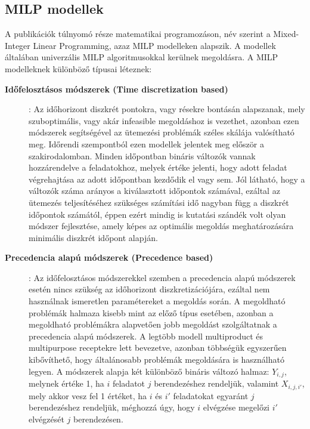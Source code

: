 \subsection{MILP modellek}
A publikációk túlnyomó része matematikai programozáson, név szerint a Mixed-Integer Linear Programming, azaz MILP modelleken alapszik.
A modellek általában univerzális MILP algoritmusokkal kerülnek megoldásra. \cite{9780471283669}
A MILP modelleknek különböző típusai léteznek:
\begin{description}
\item[\textbf{Időfelosztásos módszerek (Time discretization based)}]: Az időhorizont diszkrét pontokra, vagy résekre bontásán alapszanak, mely szuboptimális, vagy akár infeasible megoldáshoz is vezethet, azonban ezen módszerek segítségével az ütemezési problémák széles skálája valósítható meg.
Időrendi szempontból ezen modellek jelentek meg először a szakirodalomban. \cite{KONDILI1993211}
Minden időpontban bináris változók vannak hozzárendelve a feladatokhoz, melyek értéke jelenti, hogy adott feladat végrehajtása az adott időpontban kezdődik el vagy sem.
Jól látható, hogy a változók száma arányos a kiválasztott időpontok számával, ezáltal az ütemezés teljesítéséhez szükséges számítási idő nagyban függ a diszkrét időpontok számától, éppen ezért mindig is kutatási szándék volt olyan módszer fejlesztése, amely képes az optimális megoldás meghatározására minimális diszkrét időpont alapján.
\item[\textbf{Precedencia alapú módszerek (Precedence based)}]: Az időfelosztásos módszerekkel szemben a precedencia alapú módszerek esetén nincs szükség az időhorizont diszkretizációjára, ezáltal nem használnak ismeretlen paramétereket a megoldás során.
A megoldható problémák halmaza kisebb mint az előző típus esetében, azonban a megoldható problémákra alapvetően jobb megoldást szolgáltatnak a precedencia alapú módszerek.
A legtöbb modell multiproduct és multipurpose receptekre lett bevezetve, azonban többségük egyszerűen kibővíthető, hogy általánosabb problémák megoldására is használható legyen.
A módszerek alapja két különböző bináris változó halmaz: $Y_{i,j}$, melynek értéke 1, ha $i$ feladatot $j$ berendezéshez rendeljük, valamint $X_{i,j,i'}$, mely akkor vesz fel 1 értéket, ha $i$ és $i'$ feladatokat egyaránt $j$ berendezéshez rendeljük, méghozzá úgy, hogy $i$ elvégzése megelőzi $i'$ elvégzését $j$ berendezésen. 
\end{description}
